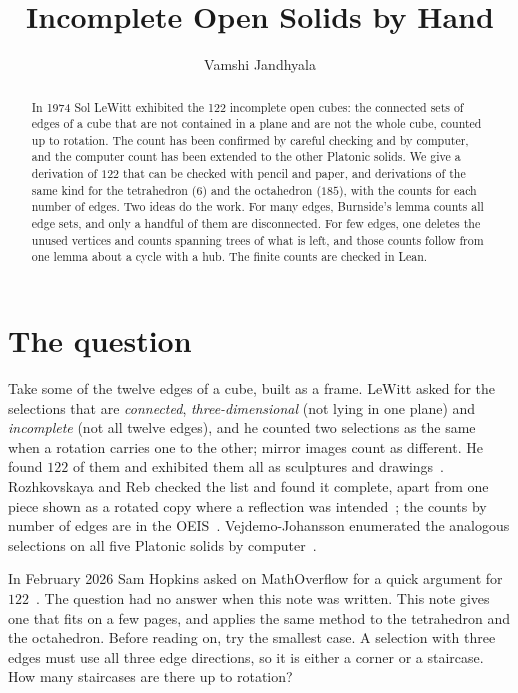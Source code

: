 \documentclass[11pt]{amsart}
\title{Incomplete Open Solids by Hand}
\author{Vamshi Jandhyala}
\theoremstyle{remark}
\begin{document}
\begin{abstract}
In 1974 Sol LeWitt exhibited the 122 incomplete open cubes: the connected sets of edges of a cube that are not contained in a plane and are not the whole cube, counted up to rotation. The count has been confirmed by careful checking and by computer, and the computer count has been extended to the other Platonic solids. We give a derivation of $122$ that can be checked with pencil and paper, and derivations of the same kind for the tetrahedron ($6$) and the octahedron ($185$), with the counts for each number of edges. Two ideas do the work. For many edges, Burnside's lemma counts all edge sets, and only a handful of them are disconnected. For few edges, one deletes the unused vertices and counts spanning trees of what is left, and those counts follow from one lemma about a cycle with a hub. The finite counts are checked in Lean.
\end{abstract}

\maketitle

\section{The question}

Take some of the twelve edges of a cube, built as a frame. LeWitt asked for the selections that are \emph{connected}, \emph{three-dimensional} (not lying in one plane) and \emph{incomplete} (not all twelve edges), and he counted two selections as the same when a rotation carries one to the other; mirror images count as different. He found $122$ of them and exhibited them all as sculptures and drawings~\cite{LeWitt}. Rozhkovskaya and Reb checked the list and found it complete, apart from one piece shown as a rotated copy where a reflection was intended~\cite{RR}; the counts by number of edges are in the OEIS~\cite{A393969}. Vejdemo-Johansson enumerated the analogous selections on all five Platonic solids by computer~\cite{VJ,A393693}.

In February 2026 Sam Hopkins asked on MathOverflow for a quick argument for $122$~\cite{MO}. The question had no answer when this note was written. This note gives one that fits on a few pages, and applies the same method to the tetrahedron and the octahedron. Before reading on, try the smallest case. A selection with three edges must use all three edge directions, so it is either a corner or a staircase. How many staircases are there up to rotation?
\end{document}
